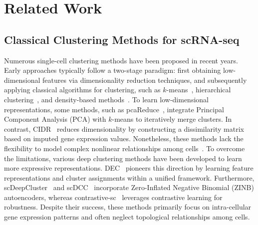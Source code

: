 \section{Related Work}
\label{sec::related}

\subsection{Classical Clustering Methods for scRNA-seq}
Numerous single-cell clustering methods have been proposed in recent years. Early approaches typically follow a two-stage paradigm: first obtaining low-dimensional features via dimensionality reduction techniques, and subsequently applying classical algorithms for clustering, such as  $k$-means~\cite{hicks2021mbkmeans}, hierarchical clustering~\cite{johnson1967hierarchical}, and density-based methods~\cite{petegrosso2020machine}. To learn low-dimensional representations, some methods, such as pcaReduce~\cite{vzurauskiene2016pcareduce}, integrate Principal Component Analysis (PCA) with $k$-means to iteratively merge clusters. In contrast, CIDR~\cite{lin2017cidr} reduces dimensionality by constructing a dissimilarity matrix based on imputed gene expression values. Nonetheless, these methods lack the flexibility to model complex nonlinear relationships among cells~\cite{stegle2015computational}. To overcome the limitations, various deep clustering methods have been developed to learn more expressive representations. DEC~\cite{xie-et-al:dec} pioneers this direction by learning feature representations and cluster assignments within a unified framework. Furthermore, scDeepCluster~\cite{tian-et-al:model-based-scrnaseq} and scDCC~\cite{tian2021model} incorporate Zero-Inflated Negative Binomial (ZINB) autoencoders, whereas contrastive-sc~\cite{ciortan2021contrastive} leverages contrastive learning for robustness. Despite their success, these methods primarily focus on intra-cellular gene expression patterns and often neglect topological relationships among cells.


